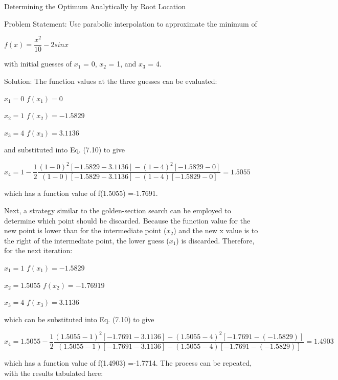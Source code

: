 \documentclass[../main.tex]{subfiles}
\begin{document}
\begin{example}
	Determining the Optimum Analytically by Root Location
	\smallskip
	
	\noindent Problem Statement:
	Use parabolic interpolation to approximate the minimum of

	$ f(x) = \dfrac{x^2}{10}-2sinx $
	\medskip
	
	with initial guesses of $x_1$ = 0, $x_2$ = 1, and $x_3$ = 4.

	\noindent Solution: The function values at the three guesses can be evaluated:
	\medskip

	$x_1 = 0$ \hspace{2cm} $f(x_1)=0$

	$x_2 = 1$ \hspace{2cm} $f(x_2)=-1.5829$

	$x_3 = 4$ \hspace{2cm} $f(x_3)=3.1136$
	\medskip

	\noindent and substituted into Eq. (7.10) to give
	\medskip
    
	$x_4=1- \dfrac{1}{2}\dfrac{(1-0)^2[-1.5829-3.1136]-(1-4)^2[-1.5829-0]}{(1-0)[-1.5829-3.1136]-(1-4)[-1.5829-0]}=1.5055 $
	\medskip

	\noindent which has a function value of f(1.5055) =-1.7691.

	Next, a strategy similar to the golden-section search can be employed to determine
	which point should be discarded. Because the function value for the new point is lower
	than for the intermediate point ($x_2$) and the new x value is to the right of the intermediate
	point, the lower guess ($x_1$) is discarded. Therefore, for the next iteration:
	\medskip

	$x_1 = 1$      \hspace{2cm} $f(x_1)=-1.5829$

	$x_2 = 1.5055$ \hspace{2cm} $f(x_2)=-1.76919$

	$x_3 = 4$      \hspace{2cm} $f(x_3)=3.1136$
	\medskip

	\noindent which can be substituted into Eq. (7.10) to give
	\medskip

	$x_4=1.5055-\dfrac{1}{2}\dfrac{(1.5055-1)^2[-1.7691-3.1136]-(1.5055-4)^2[-1.7691-(-1.5829)]}{(1.5055-1)[-1.7691-3.1136]-(1.5055-4)[-1.7691-(-1.5829)]}=1.4903 $
	\medskip

	\noindent which has a function value of f(1.4903) =-1.7714. The process can be repeated, with the
	results tabulated here:


\end{example}
\end{document}
